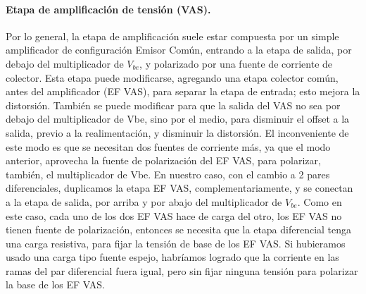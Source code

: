 \documentclass[a4paper,12pt,twoside]{article}
\begin{document}
\paragraph{Etapa de amplificación de tensión (VAS).}

Por lo general, la etapa de amplificación suele estar compuesta por un simple amplificador de configuración Emisor Común, entrando a la etapa de salida, por debajo del multiplicador de $V_{be}$, y polarizado por una fuente de corriente de colector. Esta etapa puede modificarse, agregando una etapa colector común, antes del amplificador (EF VAS), para separar la etapa de entrada; esto mejora la distorsión. También se puede modificar para que la salida del VAS no sea por debajo del multiplicador de Vbe, sino por el medio, para disminuir el offset a la salida, previo a la realimentación, y disminuir la distorsión. El inconveniente de este modo es que se necesitan dos fuentes de corriente más, ya que el modo anterior, aprovecha la fuente de polarización del EF VAS, para polarizar, también, el multiplicador de Vbe. En nuestro caso, con el cambio a 2 pares diferenciales, duplicamos la etapa EF VAS, complementariamente, y se conectan a la etapa de salida, por arriba y por abajo del multiplicador de $V_{be}$. Como en este caso, cada uno de los dos EF VAS hace de carga del otro, los EF VAS no tienen fuente de polarización, entonces se necesita que la etapa diferencial tenga una carga resistiva, para fijar la tensión de base de los EF VAS. Si hubieramos usado una carga tipo fuente espejo, habríamos logrado que la corriente en las ramas del par diferencial fuera igual, pero sin fijar ninguna tensión para polarizar la base de los EF VAS.
\end{document}
